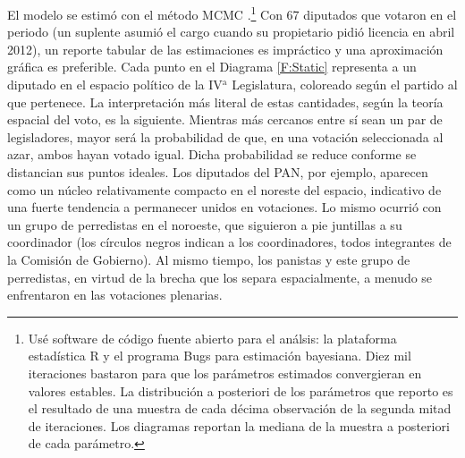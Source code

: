 El modelo se estimó con el método MCMC \citep{clinton.jackman.rivers.2004}.\footnote{Usé software de código fuente abierto para el análsis: la plataforma estadística R \citeyearpar{r.cite} y el programa Bugs \citep{winbugs.2000} para estimación bayesiana. Diez mil iteraciones bastaron para que los parámetros estimados convergieran en valores estables. La distribución a posteriori de los parámetros que reporto es el resultado de una muestra de cada décima observación de la segunda mitad de iteraciones. Los diagramas reportan la mediana de la muestra a posteriori de cada parámetro.} Con 67 diputados que votaron en el periodo (un suplente asumió el cargo cuando su propietario pidió licencia en abril 2012), un reporte tabular de las estimaciones es impráctico y una aproximación gráfica es preferible. Cada punto en el Diagrama \ref{F:Static} representa a un diputado en el espacio político de la IV$^\text{a}$ Legislatura, coloreado según el partido al que pertenece. La interpretación más literal de estas cantidades, según la teoría espacial del voto, es la siguiente. Mientras más cercanos entre sí sean un par de legisladores, mayor será la probabilidad de que, en una votación seleccionada al azar, ambos hayan votado igual. Dicha probabilidad se reduce conforme se distancian sus puntos ideales. Los diputados del PAN, por ejemplo, aparecen como un núcleo relativamente compacto en el noreste del espacio, indicativo de una fuerte tendencia a permanecer unidos en votaciones. Lo mismo ocurrió con un grupo de perredistas en el noroeste, que siguieron a pie juntillas a su coordinador (los círculos negros indican a los coordinadores, todos integrantes de la Comisión de Gobierno). Al mismo tiempo, los panistas y este grupo de perredistas, en virtud de la brecha que los separa espacialmente, a menudo se enfrentaron en las votaciones plenarias.

\usepackage{interval} %

